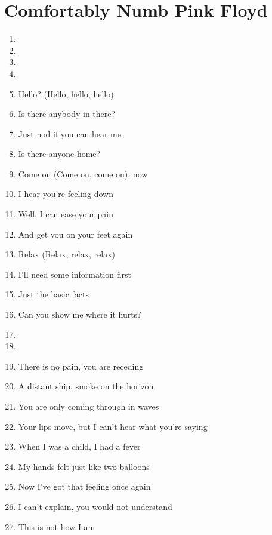 \documentclass{article}
\begin{document}
    
    \section*{Comfortably Numb \by Pink Floyd}

    \begin{enumerate}
        
        \item[]
        \item[] \intro

        \item[]
        \item[] 
        \item Hello? (Hello, hello, hello)
        \item Is there anybody in there?
        \item Just nod if you can hear me
        \item Is there anyone home?
        \item Come on (Come on, come on), now
        \item I hear you're feeling down
        \item Well, I can ease your pain
        \item And get you on your feet again
        \item Relax (Relax, relax, relax)
        \item I'll need some information first
        \item Just the basic facts
        \item Can you show me where it hurts?

        \item[]
        \item[] \chorus
        \item There is no pain, you are receding
        \item A distant ship, smoke on the horizon
        \item You are only coming through in waves
        \item Your lips move, but I can't hear what you're saying
        \item When I was a child, I had a fever
        \item My hands felt just like two balloons
        \item Now I've got that feeling once again
        \item I can't explain, you would not understand
        \item This is not how I am


\end{enumerate}
\end{document}
